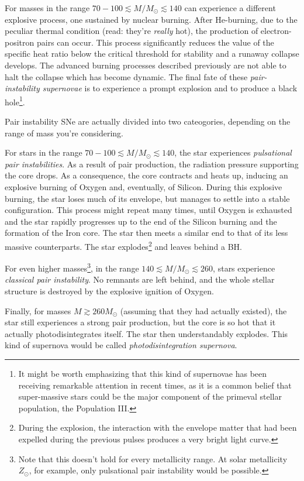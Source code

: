 For masses in the range $70-100 \lesssim M/M_{\odot} \lesssim 140$ can experience a different explosive process, one sustained by nuclear burning. After He-burning, due to the peculiar thermal condition (read: they're \emph{really} hot), the production of electron-positron pairs can occur. This process significantly reduces the value of the specific heat ratio below the critical threshold for stability and a runaway collapse develops. The advanced burning processes described previously are not able to halt the collapse which has become dynamic. The final fate of these \emph{pair-instability supernovae} is to experience a prompt explosion and to produce a black hole\footnote{It might be worth emphasizing that this kind of supernovae has been receiving remarkable attention in recent times, as it is a common belief that super-massive stars could be the major component of the primeval stellar population, the Population III.}.
\par Pair instability SNe are actually divided into two cateogories, depending on the range of mass you're considering.
\par For stars in the range $70-100 \lesssim M/M_{\odot} \lesssim 140$, the star experiences \emph{pulsational pair instabilities}. As a result of pair production, the radiation pressure supporting the core drops. As a consequence, the core contracts and heats up, inducing an explosive burning of Oxygen and, eventually, of Silicon. During this explosive burning, the star loses much of its envelope, but manages to settle into a stable configuration. This process might repeat many times, until Oxygen is exhausted and the star rapidly progresses up to the end of the Silicon burning and the formation of the Iron core. The star then meets a similar end to that of its less massive counterparts. The star explodes\footnote{During the explosion, the interaction with the envelope matter that had been expelled during the previous pulses produces a very bright light curve.} and leaves behind a BH.
\par For even higher masses\footnote{Note that this doesn't hold for every metallicity range. At solar metallicity $Z_{\odot}$, for example, only pulsational pair instability would be possible.}, in the range $140 \lesssim M/M_{\odot} \lesssim 260$, stars experience \emph{classical pair instability}. No remnants are left behind, and the whole stellar structure is destroyed by the explosive ignition of Oxygen.
\par Finally, for masses $M\gtrsim 260M_{\odot}$ (assuming that they had actually existed), the star still experiences a strong pair production, but the core is so hot that it actually photodisintegrates itself. The star then understandably explodes. This kind of supernova would be called \emph{photodisintegration supernova}.

